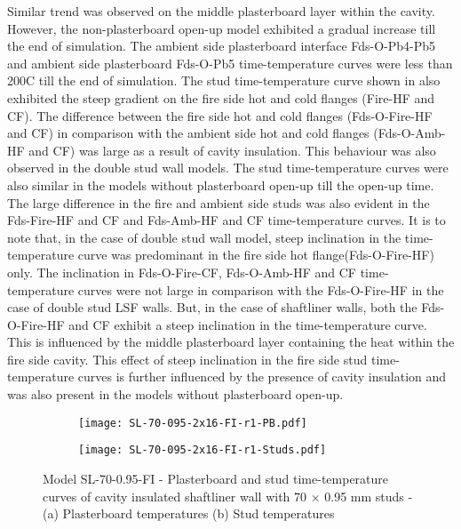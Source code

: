 Similar trend was observed on the middle plasterboard layer within the cavity. However, the non-plasterboard open-up model exhibited a gradual increase till the end of simulation. The ambient side plasterboard interface Fds-O-Pb4-Pb5 and ambient side plasterboard Fds-O-Pb5 time-temperature curves were less than 200\degree C till the end of simulation. The stud time-temperature curve shown in  also exhibited the steep gradient on the fire side hot and cold flanges (Fire-HF and CF). The difference between the fire side hot and cold flanges (Fds-O-Fire-HF and CF) in comparison with the ambient side hot and cold flanges (Fds-O-Amb-HF and CF) was large as a result of cavity insulation. This behaviour was also observed in the double stud wall models. The stud time-temperature curves were also similar in the models without plasterboard open-up till the open-up time. The large difference in the fire and ambient side studs was also evident in the Fds-Fire-HF and CF and Fds-Amb-HF and CF time-temperature curves. It is to note that, in the case of double stud wall model, steep inclination in the time-temperature curve was predominant in the fire side hot flange(Fds-O-Fire-HF) only. The inclination in Fds-O-Fire-CF, Fds-O-Amb-HF and CF time-temperature curves were not large in comparison with the Fds-O-Fire-HF in the case of double stud LSF walls. But, in the case of shaftliner walls, both the Fds-O-Fire-HF and CF exhibit a steep inclination in the time-temperature curve. This is influenced by the middle plasterboard layer containing the heat within the fire side cavity. This effect of steep inclination in the fire side stud time-temperature curves is further influenced by the presence of cavity insulation and was also present in the models without plasterboard open-up. 
\begin{figure}[!htbp]
	\centering
	\begin{subfigure}[b]{0.6\textwidth}
		\centering
		\texttt{[image: SL-70-095-2x16-FI-r1-PB.pdf]}
		\caption{}
		\label{subfig:SL-70-095-2x16-FI-r1-PB}
	\end{subfigure}
\begin{subfigure}[b]{0.6\textwidth}
	\centering
	\texttt{[image: SL-70-095-2x16-FI-r1-Studs.pdf]}
	\caption{}
	\label{subfig:SL-70-095-2x16-FI-r1-Studs}
\end{subfigure}
   \caption{Model SL-70-0.95-FI - Plasterboard and stud time-temperature curves of cavity insulated shaftliner wall with 70 $\times$ 0.95 mm studs - (a) Plasterboard temperatures (b) Stud temperatures}
   \label{fig:SL-70-095-2x16-FI-r1}
\end{figure}


